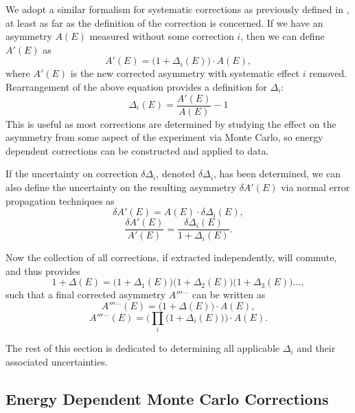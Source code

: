 We adopt a similar formalism for systematic corrections as previously defined in
\cite{mpmThesis}, at least as far as the definition of the correction is concerned.
If we have an asymmetry $A(E)$ measured without some correction $i$,
then we can define $A'(E)$ as
%
\begin{equation} \label{eq:aprimedelta}
  A'(E) = \big( 1 + \Delta_i(E) \big) \cdot A(E),
\end{equation}
%
\noindent where $A'(E)$ is the new corrected asymmetry with systematic effect $i$ removed.
Rearrangement of the above equation provides a definition for $\Delta_i$:
%
\begin{equation} \label{eq:delta}
  \Delta_i(E) = \frac{A'(E)}{A(E)} - 1
\end{equation}
%
This is useful as most corrections are determined by studying the effect on the asymmetry
from some aspect of the experiment via Monte Carlo, so energy dependent corrections can
be constructed and applied to data.

If the uncertainty on correction $\delta\Delta_i$, denoted $\delta \Delta_i$,
has been determined, we can also define
the uncertainty on the resulting asymmetry $\delta A'(E)$ via normal error propagation
techniques as
%
\begin{equation} 
  \delta A'(E) = A(E) \cdot \delta\Delta_i(E),
\end{equation}
%
\begin{equation} 
  \frac{\delta A'(E)}{A'(E)} =  \frac{ \delta\Delta_i(E)}{1+\Delta_i(E)}.
\end{equation}

Now the collection of all corrections, if extracted independently, will commute, and thus
provides
%
\begin{equation}
1+\Delta(E)=\big(1+\Delta_1(E)\big)\big(1+\Delta_2(E)\big)\big(1+\Delta_3(E)\big)\ldots,
\end{equation}
%
\noindent such that a final corrected asymmetry $A'''^{\ldots}$ can be written as 
%
\begin{equation*}
A'''^{\ldots}(E) = \big(1+\Delta(E)\big) \cdot A(E),
\end{equation*}
%
\begin{equation}
A'''^{\ldots}(E) = \Big(\prod_i\big(1+\Delta_i(E)\big)\Big)\cdot A(E).
\end{equation}

The rest of this section is dedicated to determining all applicable $\Delta_i$
and their associated uncertainties.

\subsection{Energy Dependent Monte Carlo Corrections}


